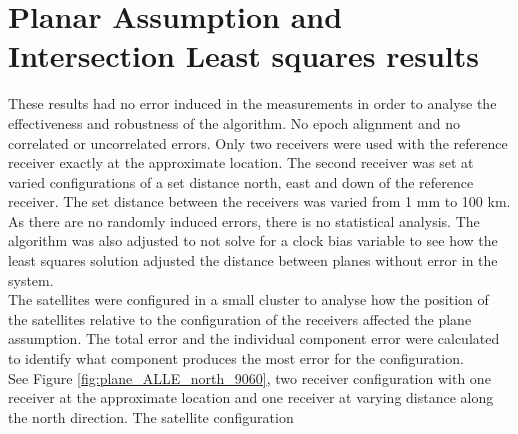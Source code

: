 
\section{Planar Assumption and Intersection Least squares results}
These results had no error induced in the measurements in order to analyse the effectiveness and robustness of the algorithm. No epoch alignment and no correlated or uncorrelated errors. Only two receivers were used with the reference receiver exactly at the approximate location. The second receiver was set at varied configurations of a set distance north, east and down of the reference receiver. The set distance between the receivers was varied from 1 mm to 100 km. As there are no randomly induced errors, there is no statistical analysis. The algorithm was also adjusted to not solve for a clock bias variable to see how the least squares solution adjusted the distance between planes without error in the system.\\

The satellites were configured in a small cluster to analyse how the position of the satellites relative to the configuration of the receivers affected the plane assumption. The total error and the individual component error were calculated to identify what component produces the most error for the configuration.\\

See Figure \ref{fig:plane_ALLE_north_9060}, two receiver configuration with one receiver at the approximate location and one receiver at varying distance along the north direction. The satellite configuration 


